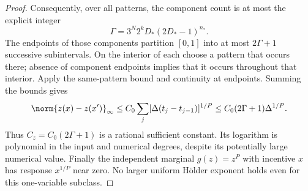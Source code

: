 \begin{proof}
Consequently, over all patterns, the component count is at most the
explicit integer
\[
 \Gamma=3^N2^kD_*(2D_*-1)^{n_*}.
\]
The endpoints of those components partition $[0,1]$ into at most
$2\Gamma+1$ successive subintervals. On the interior of each choose a
pattern that occurs there; absence of component endpoints implies that
it occurs throughout that interior. Apply the same-pattern bound and
continuity at endpoints. Summing the bounds gives
\[
 \norm{z(x)-z(x')}_\infty
 \le C_0\sum_j[\Delta(t_j-t_{j-1})]^{1/P}
 \le C_0(2\Gamma+1)\Delta^{1/P}.
\]
Thus $C_z=C_0(2\Gamma+1)$ is a rational sufficient constant. Its
logarithm is polynomial in the input and numerical degrees, despite
its potentially large numerical value. Finally the independent marginal
$g(z)=z^P$ with incentive $x$ has response $x^{1/P}$ near zero.
No larger uniform H\"older exponent holds even for this one-variable
subclass.
\end{proof}
